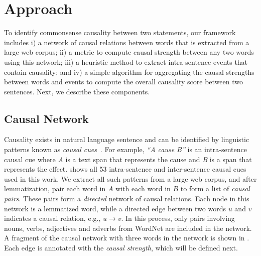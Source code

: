 \section{Approach}
\label{sec:approach} To identify commonsense causality between two
statements, our framework includes i) a network of causal relations
between words that is extracted from a large web corpus; ii) a
metric to compute causal strength between any two words using this
network; iii) a heuristic method to extract intra-sentence events
that contain causality; and iv) a simple algorithm for aggregating
the causal strengths between words and events to compute the overall
causality score between two sentences. Next, we describe these
components.
%
\subsection{Causal Network}
\label{sec:network}
Causality exists in natural language sentence and can be identified by
linguistic patterns known as {\em causal cues}~\cite{ChangC04}.
For example, \textit{``A cause B''} is an intra-sentence causal
cue where \textit{A} is a text span that represents the cause
and \textit{B} is a span that represents the effect.
 shows all 53 intra-sentence and inter-sentence
causal cues used in this work.
We extract all such patterns from a large
web corpus, and after lemmatization, pair each word in $A$ with each word
in $B$ to form a list of \textit{causal pairs}.
These pairs form a {\em directed} network of causal relations. Each
node in this network is a lemmatized word, while a directed edge between two words
$u$ and $v$ indicates a causal relation, e.g., $u \rightarrow v$.
In this process, only pairs involving nouns, verbs,
adjectives and adverbs from WordNet are included in the network.
A fragment of the causal network with three words in the network is
shown in .
Each edge is annotated with the {\em causal strength}, which will be defined
next.

